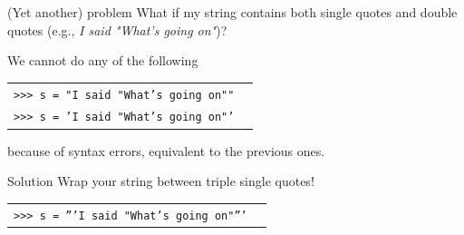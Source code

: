 \documentclass[t,handout,9pt]{beamer}
\begin{document}
%
\begin{frame}
\vfill
\begin{block}{(Yet another) problem}
What if my string contains both single quotes and double quotes (e.g., \textit{I said "What's going on"})?
\end{block}
We cannot do any of the following
\begin{table}[]
\begin{tabular}{ll}
\texttt{>{}>{}> s = "I said "What's going on""} & \\
\texttt{>{}>{}> s = 'I said "What's going on"'} & \\
\end{tabular}
\end{table}
because of syntax errors, equivalent to the previous ones.
\vfill
\begin{block}{Solution}
Wrap your string between triple single quotes!
\end{block}
\vfill
\begin{table}[]
\begin{tabular}{ll}
\texttt{>{}>{}> s = '''I said "What's going on"'''} & \\
\end{tabular}
\end{table}
\vfill
\end{frame}
%
\end{document}
